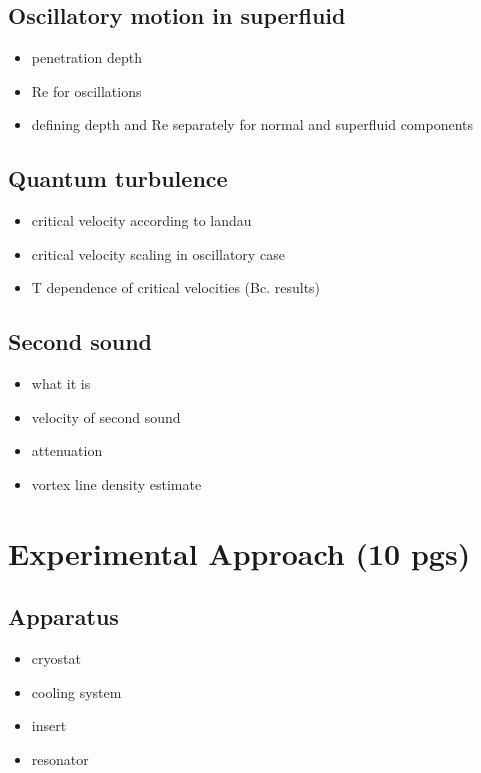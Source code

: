\documentclass[a4paper, 12pt]{report}
\newcommand{\<}{\langle} %
\renewcommand{\>}{\rangle} %
\begin{document}
\section{Oscillatory motion in superfluid}
\begin{itemize}
	\item penetration depth
	\item Re for oscillations
	\item defining depth and Re separately for normal and superfluid components
\end{itemize}

\section{Quantum turbulence}
\begin{itemize}
	\item critical velocity according to landau
	\item critical velocity scaling in oscillatory case
	\item T dependence of critical velocities (Bc. results)
\end{itemize}

\section{Second sound}
\begin{itemize}
	\item what it is
	\item velocity of second sound
	\item attenuation
	\item vortex line density estimate
\end{itemize}

\newpage

\chapter{Experimental Approach (10 pgs)}

\section{Apparatus}
\begin{itemize}
	\item cryostat
	\item cooling system
	\item insert
	\item resonator
\end{itemize}
\end{document}
